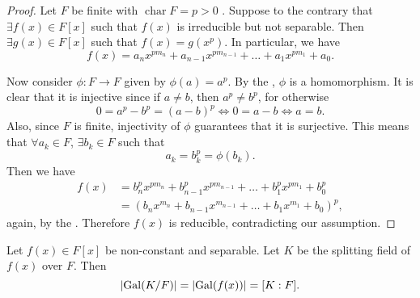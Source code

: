 \documentclass[notoc,notitlepage,nobib]{tufte-book}
\DeclareMathOperator{\Gal}{Gal}
\DeclareMathOperator{\Char}{char}
\begin{document}
\begin{proof}
  Let $F$ be finite with $\Char F = p > 0$ . Suppose
  to the contrary that $\exists f(x) \in F[x]$ such that $f(x)$ is irreducible
  but not separable. Then $\exists g(x) \in F[x]$ such that $f(x) = g(x^p)$. In
  particular, we have
  \begin{equation*}
    f(x) = a_n x^{p m_n} + a_{n - 1} x^{p m_{n - 1}} + \hdots + a_1 x^{p m_1} +
    a_0.
  \end{equation*}

  Now consider $\phi : F \to F$ given by $\phi(a) = a^p$. By the
  , $\phi$ is a homomorphism. It is clear that it is
  injective since if $a \neq b$, then $a^p \neq b^p$, for otherwise
  \begin{equation*}
    0 = a^p - b^p = (a - b)^p \iff 0 = a - b \iff a = b.
  \end{equation*}
  Also, since $F$ is finite, injectivity of $\phi$ guarantees that it is
  surjective. This means that $\forall a_k \in F$, $\exists b_k \in F$ such that
  \begin{equation*}
    a_k = b_k^p = \phi(b_k).
  \end{equation*}
  Then we have
  \begin{align*}
    f(x) &= b_n^p x^{p m_n} + b_{n - 1}^p x^{p m_{n - 1}} + \hdots + b_1^p x^{p
          m_1} + b_0^p \\
         &= ( b_n x^{m_n} + b_{n - 1} x^{m_{n - 1}} + \hdots + b_1 x^{m_1} + b_0
          )^p,
  \end{align*}
  again, by the . Therefore $f(x)$ is reducible,
  contradicting our assumption.
\end{proof}

\begin{thm}\label{thm:galois_group_of_a_splitting_field_of_a_separable_polynomial_has_order_the_degree_of_the_extension}
  Let $f(x) \in F[x]$ be non-constant and separable. Let $K$ be the splitting
  field of $f(x)$ over $F$. Then
  \begin{equation*}
    \abs{ \Gal(K / F) } = \abs{ \Gal(f(x)) } = [ K : F ].
  \end{equation*}
\end{thm}
\end{document}

